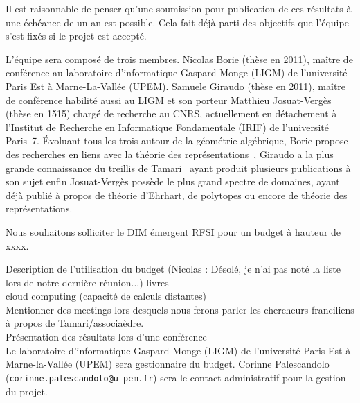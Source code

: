 \documentclass[a4paper, 10pt]{article}
\numberwithin{equation}{subsection}
\begin{document}
Il est raisonnable de penser qu'une soumission pour publication de ces
résultats à une échéance de un an est possible. Cela fait déjà parti
des objectifs que l'équipe s'est fixés si le projet est accepté.



L'équipe sera composé de trois membres. Nicolas Borie (thèse en 2011),
maître de conférence au laboratoire d'informatique Gaspard Monge
(LIGM) de l'université Paris Est à Marne-La-Vallée (UPEM). Samuele
Giraudo (thèse en 2011), maître de conférence habilité aussi au LIGM
et son porteur Matthieu Josuat-Vergès (thèse en 1515) chargé de
recherche au CNRS, actuellement en détachement à l'Institut de
Recherche en Informatique Fondamentale (IRIF) de l'université Paris~7.
Évoluant tous les trois autour de la géométrie algébrique, Borie
propose des recherches en liens avec la théorie des
représentations~\cite{MR3448031}, Giraudo a la plus grande
connaissance du treillis de Tamari~\cite{MR2887627} ayant produit
plusieurs publications à son sujet enfin Josuat-Vergès possède le plus
grand spectre de domaines, ayant déjà publié à propos de théorie
d'Ehrhart, de polytopes ou encore de théorie des représentations.



Nous souhaitons solliciter le DIM émergent RFSI pour un budget à hauteur de xxxx.


Description de l'utilisation du budget (Nicolas : Désolé, je n'ai pas noté la liste lors de notre dernière réunion...)
livres \\
cloud computing (capacité de calculs distantes) \\
Mentionner des meetings lors desquels nous ferons parler les chercheurs franciliens à propos de Tamari/associaèdre. \\
Présentation des résultats lors d'une conférence \\



Le laboratoire d'informatique Gaspard Monge (LIGM) de l'université
Paris-Est à Marne-la-Vallée (UPEM) sera gestionnaire du
budget. Corinne Palescandolo (\texttt{corinne.palescandolo@u-pem.fr})
sera le contact administratif pour la gestion du projet.





\end{document}
